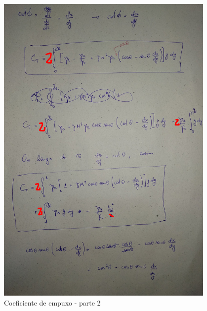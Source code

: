 \documentclass[12pt,a4paper]{article}
\begin{document}
\begin{figure}[!ht]
	\centering
	\includegraphics[width=0.95\textwidth]{./fig/CT2}
	\caption{Coeficiente de empuxo - parte 2}
	\label{fig:CT2}
\end{figure}
\end{document}
